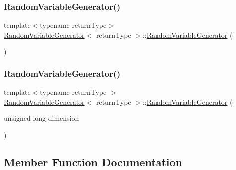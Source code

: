 \subsubsection{\texorpdfstring{Random\+Variable\+Generator()}{RandomVariableGenerator()}\hspace{0.1cm}{\footnotesize\ttfamily [1/2]}}
{\footnotesize\ttfamily template$<$typename return\+Type$>$ \\
\hyperlink{class_random_variable_generator}{Random\+Variable\+Generator}$<$ return\+Type $>$\+::\hyperlink{class_random_variable_generator}{Random\+Variable\+Generator} (\begin{DoxyParamCaption}{ }\end{DoxyParamCaption})\hspace{0.3cm}{\ttfamily [inline]}}

\hypertarget{class_random_variable_generator_a4bb14a0ef48a87cea066c69ea74175af}{}\label{class_random_variable_generator_a4bb14a0ef48a87cea066c69ea74175af} 
\subsubsection{\texorpdfstring{Random\+Variable\+Generator()}{RandomVariableGenerator()}\hspace{0.1cm}{\footnotesize\ttfamily [2/2]}}
{\footnotesize\ttfamily template$<$typename return\+Type $>$ \\
\hyperlink{class_random_variable_generator}{Random\+Variable\+Generator}$<$ return\+Type $>$\+::\hyperlink{class_random_variable_generator}{Random\+Variable\+Generator} (\begin{DoxyParamCaption}\item[{unsigned long}]{dimension }\end{DoxyParamCaption})}



\subsection{Member Function Documentation}
\hypertarget{class_random_variable_generator_aa84922aa58871845bc12116e05e6b5d4}{}\label{class_random_variable_generator_aa84922aa58871845bc12116e05e6b5d4} 
